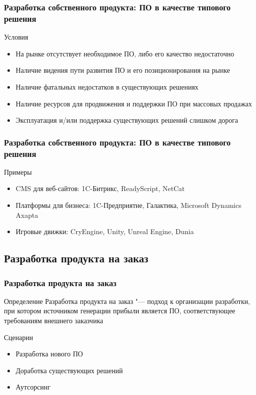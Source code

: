 \documentclass{../industrial-development}
\begin{document}
\begin{frame} \frametitle{Разработка собственного продукта: ПО в качестве типового решения}
	\begin{block}{Условия}
		\begin{itemize}
			\item На рынке отсутствует необходимое ПО, либо его качество недостаточно
			\item Наличие видения пути развития ПО и его позиционирования на рынке
			\item Наличие фатальных недостатков в существующих решениях
			\item Наличие ресурсов для продвижения и поддержки ПО при массовых продажах
			\item Эксплуатация и/или поддержка существующих решений слишком дорога
		\end{itemize}
	\end{block}
\end{frame}
\lecturenotes


\begin{frame} \frametitle{Разработка собственного продукта: ПО в качестве типового решения}
	\begin{block}{Примеры}
		\begin{itemize}
			\item CMS для веб-сайтов: 1C-Битрикс, ReadyScript, NetCat
			\item Платформы для бизнеса: 1C-Предприятие, Галактика, Microsoft Dynamics Axapta
			\item Игровые движки: CryEngine, Unity, Unreal Engine, Dunia
		\end{itemize}
	\end{block}
\end{frame}
\lecturenotes


\subsection{Разработка продукта на заказ}


\begin{frame} \frametitle{Разработка продукта на заказ}
	\begin{block}{Определение}
		\alert{Разработка продукта на заказ} "--- подход к организации разработки, при котором источником генерации прибыли является ПО, соответствующее требованиям внешнего заказчика
	\end{block}
	\begin{block}{Сценарии}
		\begin{itemize}
			\item Разработка нового ПО
			\item Доработка существующих решений
			\item Аутсорсинг
		\end{itemize}
	\end{block}
\end{frame}
\lecturenotes
\end{document}
